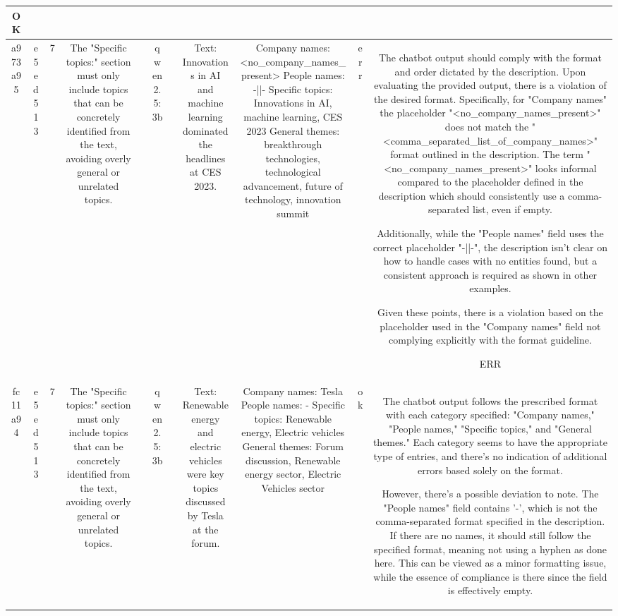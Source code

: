 \begin{table}[h!]
\begin{tabular}{|c|c|c|c|c|c|c|c|c|c|c|}
OK\\
\hline
a973a95 & e5ed513 & 7 & The "Specific topics:" section must only include topics that can be concretely identified from the text, avoiding overly general or unrelated topics. &  & qwen2.5:3b &  & Text: Innovations in AI and machine learning dominated the headlines at CES 2023. & Company names: <no_company_names_present>
People names: -||-
Specific topics: Innovations in AI, machine learning, CES 2023
General themes: breakthrough technologies, technological advancement, future of technology, innovation summit & err & The chatbot output should comply with the format and order dictated by the description. Upon evaluating the provided output, there is a violation of the desired format. Specifically, for "Company names" the placeholder "<no_company_names_present>" does not match the "<comma_separated_list_of_company_names>" format outlined in the description. The term "<no_company_names_present>" looks informal compared to the placeholder defined in the description which should consistently use a comma-separated list, even if empty. 

Additionally, while the "People names" field uses the correct placeholder "-||-", the description isn't clear on how to handle cases with no entities found, but a consistent approach is required as shown in other examples.

Given these points, there is a violation based on the placeholder used in the "Company names" field not complying explicitly with the format guideline.

ERR\\
\hline
fc11a94 & e5ed513 & 7 & The "Specific topics:" section must only include topics that can be concretely identified from the text, avoiding overly general or unrelated topics. &  & qwen2.5:3b &  & Text: Renewable energy and electric vehicles were key topics discussed by Tesla at the forum. & Company names: Tesla
People names: -
Specific topics: Renewable energy, Electric vehicles
General themes: Forum discussion, Renewable energy sector, Electric Vehicles sector & ok & The chatbot output follows the prescribed format with each category specified: "Company names," "People names," "Specific topics," and "General themes." Each category seems to have the appropriate type of entries, and there's no indication of additional errors based solely on the format.

However, there's a possible deviation to note. The "People names" field contains '-', which is not the comma-separated format specified in the description. If there are no names, it should still follow the specified format, meaning not using a hyphen as done here. This can be viewed as a minor formatting issue, while the essence of compliance is there since the field is effectively empty.


\end{tabular}
\end{table}

